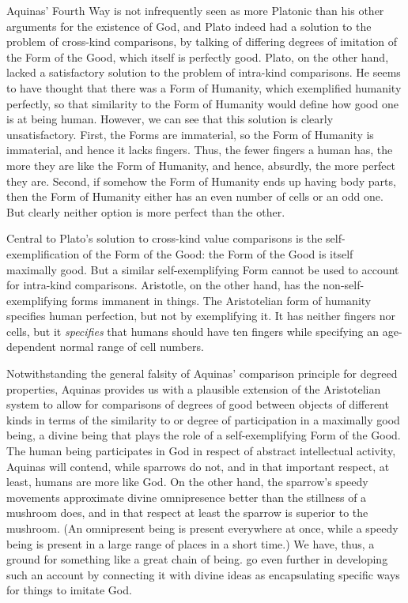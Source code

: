 Aquinas' Fourth Way is not infrequently seen as more Platonic than his other arguments for the existence of
God, and Plato indeed had a solution to the problem of cross-kind comparisons, by talking of differing degrees
of imitation of the Form of the Good, which itself is perfectly good. Plato, on the other hand, lacked a 
satisfactory solution to the problem of intra-kind comparisons. He seems to have thought that there 
was a Form of Humanity, which exemplified humanity perfectly, so that similarity to the Form of 
Humanity would define how good one is at being human. However,
we can see that this solution is clearly unsatisfactory. First, the Forms are immaterial, so the Form of Humanity is 
immaterial, and hence it lacks fingers. Thus, the fewer fingers a human has, the more they are like the Form of
Humanity, and hence, absurdly, the more perfect they are. Second, if somehow the Form of Humanity ends up having 
body parts, then the Form of Humanity either has an even number of cells or an odd one. But clearly neither option
is more perfect than the other. 

Central to Plato's solution to cross-kind value comparisons is the self-exemplification of the Form of the Good:
the Form of the Good is itself maximally good. But a similar self-exemplifying Form cannot be used to account for
intra-kind comparisons. Aristotle, on the other hand, has the non-self-exemplifying forms immanent in things. 
The Aristotelian form of humanity specifies human perfection, but not by exemplifying it. It has neither
fingers nor cells, but it \textit{specifies} that humans should have ten fingers while specifying an age-dependent
normal range of cell numbers.

Notwithstanding the general falsity of Aquinas' comparison principle for degreed properties, Aquinas provides us
with a plausible extension of the Aristotelian system to allow for comparisons of degrees of good between objects
of different kinds in terms of the similarity to or degree of participation in a maximally good being, a divine being
that plays the role of a self-exemplifying Form of the Good. The human being participates in God in respect of
abstract intellectual activity, Aquinas will contend, while sparrows do not, and in that important respect, at least,
humans are more like God. On the other hand, the sparrow's speedy movements approximate divine omnipresence better than 
the stillness of a mushroom does, and in that respect at least the sparrow is superior to the mushroom. (An omnipresent
being is present everywhere at once, while a speedy being is present in a large range of places in a short time.) 
We have, thus, a ground for something like a great chain of being.  go even further in developing
such an account by connecting it with divine ideas as encapsulating specific ways for things to imitate God.

